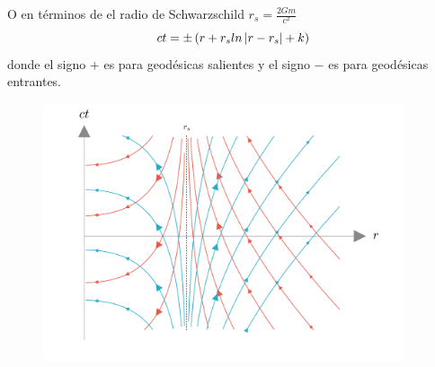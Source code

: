 O en términos de el radio de Schwarzschild $r_s = \frac{2 G m}{c^2}$
\begin{equation}
    ct = \pm \left(r + r_s ln\left| r - r_s \right| + k \right)
\end{equation}
donde el signo $+$ es para geodésicas salientes y el signo $-$ es para geodésicas entrantes.
\begin{figure}[H]
    \begin{small}
        \begin{center}
            \includegraphics[width=0.95\textwidth]{AgujerosNegros/Schwarzschild/media/images/rayos_Luz_Schwarzschild_ManimCE_v0.19.0.png}
        \end{center}
        \caption{}
        \label{fig:lightraysSchwarzschild}
    \end{small}
\end{figure}

